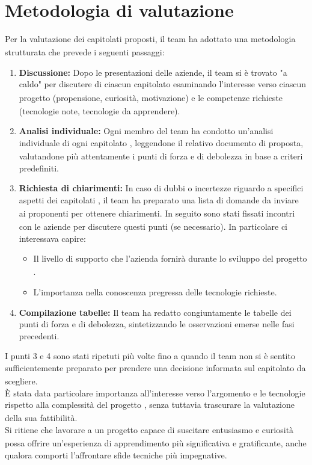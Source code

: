 \documentclass[a4paper,11pt]{article}
\begin{document}
\section{Metodologia di valutazione}
Per la valutazione dei capitolati\textsubscript{}
 proposti, il team ha adottato una metodologia strutturata che prevede i seguenti passaggi:
\begin{enumerate}
\item \textbf{Discussione:} Dopo le presentazioni delle aziende, il team si è trovato "a caldo" per discutere di ciascun capitolato\textsubscript{}
 esaminando l'interesse verso ciascun progetto\textsubscript{}
 (propensione, curiosità, motivazione) e le competenze richieste (tecnologie note, tecnologie da apprendere).
\item \textbf{Analisi individuale:} Ogni membro del team ha condotto un'analisi individuale di ogni capitolato\textsubscript{}
, leggendone il relativo documento di proposta, valutandone più attentamente i punti di forza e di debolezza in base a criteri predefiniti.
\item \textbf{Richiesta di chiarimenti:} In caso di dubbi o incertezze riguardo a specifici aspetti dei capitolati\textsubscript{}
, il team ha preparato una lista di domande da inviare ai proponenti\textsubscript{}
 per ottenere chiarimenti. In seguito sono stati fissati incontri con le aziende per discutere questi punti (se necessario).
 In particolare ci interessava capire:
 \begin{itemize}
  \item Il livello di supporto che l'azienda fornirà durante lo sviluppo del progetto\textsubscript{}
.
  \item L'importanza nella conoscenza pregressa delle tecnologie richieste.
 \end{itemize}
\item \textbf{Compilazione tabelle:} Il team ha redatto congiuntamente le tabelle dei punti di forza e di debolezza, sintetizzando le osservazioni emerse nelle fasi precedenti.
\end{enumerate}
I punti 3 e 4 sono stati ripetuti più volte fino a quando il team non si è sentito sufficientemente preparato per prendere una decisione informata sul capitolato\textsubscript{}
 da scegliere.\\
È stata data particolare importanza all'interesse verso l'argomento e le tecnologie rispetto alla complessità del progetto\textsubscript{}
, senza tuttavia trascurare la valutazione della sua fattibilità.\\
Si ritiene che lavorare a un progetto\textsubscript{}
 capace di suscitare entusiasmo e curiosità possa offrire un'esperienza di apprendimento più significativa e gratificante, anche qualora comporti l'affrontare sfide tecniche più impegnative.
\end{document}
